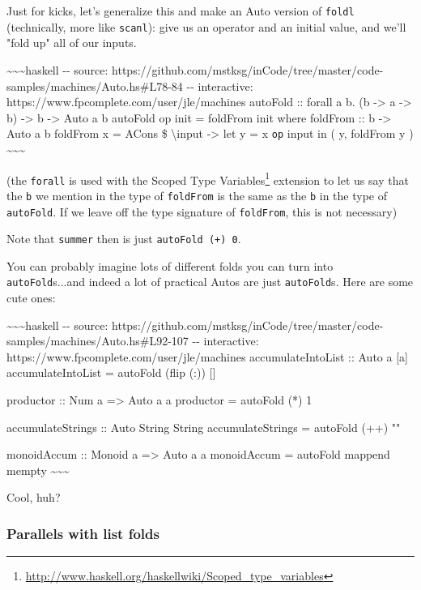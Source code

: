 \documentclass[]{article}
\renewcommand{\href}[2]{#2\footnote{\url{#1}}}
\begin{document}
Just for kicks, let's generalize this and make an Auto version of \texttt{foldl}
(technically, more like \texttt{scanl}): give us an operator and an initial
value, and we'll "fold up" all of our inputs.

\textasciitilde{}\textasciitilde{}\textasciitilde{}haskell -\/- source:
https://github.com/mstksg/inCode/tree/master/code-samples/machines/Auto.hs\#L78-84
-\/- interactive: https://www.fpcomplete.com/user/jle/machines autoFold ::
forall a b. (b -\textgreater{} a -\textgreater{} b) -\textgreater{} b
-\textgreater{} Auto a b autoFold op init = foldFrom init where foldFrom :: b
-\textgreater{} Auto a b foldFrom x = ACons \$ \textbackslash{}input
-\textgreater{} let y = x \texttt{op} input in ( y, foldFrom y )
\textasciitilde{}\textasciitilde{}\textasciitilde{}

(the \texttt{forall} is used with the
\href{http://www.haskell.org/haskellwiki/Scoped_type_variables}{Scoped Type
Variables} extension to let us say that the \texttt{b} we mention in the type of
\texttt{foldFrom} is the same as the \texttt{b} in the type of
\texttt{autoFold}. If we leave off the type signature of \texttt{foldFrom}, this
is not necessary)

Note that \texttt{summer} then is just \texttt{autoFold\ (+)\ 0}.

You can probably imagine lots of different folds you can turn into
\texttt{autoFold}s...and indeed a lot of practical Autos are just
\texttt{autoFold}s. Here are some cute ones:

\textasciitilde{}\textasciitilde{}\textasciitilde{}haskell -\/- source:
https://github.com/mstksg/inCode/tree/master/code-samples/machines/Auto.hs\#L92-107
-\/- interactive: https://www.fpcomplete.com/user/jle/machines
accumulateIntoList :: Auto a {[}a{]} accumulateIntoList = autoFold (flip (:))
{[}{]}

productor :: Num a =\textgreater{} Auto a a productor = autoFold (*) 1

accumulateStrings :: Auto String String accumulateStrings = autoFold (++) ""

monoidAccum :: Monoid a =\textgreater{} Auto a a monoidAccum = autoFold mappend
mempty \textasciitilde{}\textasciitilde{}\textasciitilde{}

Cool, huh?

\subsubsection{Parallels with list folds}
\end{document}
